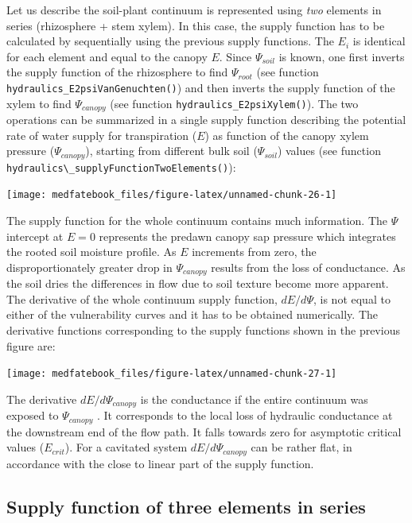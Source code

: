 \documentclass[]{book}
\begin{document}
Let us describe the soil-plant continuum is represented using \emph{two} elements in series (rhizosphere + stem xylem). In this case, the supply function has to be calculated by sequentially using the previous supply functions. The \(E_i\) is identical for each element and equal to the canopy \(E\). Since \(\Psi_{soil}\) is known, one first inverts the supply function of the rhizosphere to find \(\Psi_{root}\) (see function \texttt{hydraulics\_E2psiVanGenuchten()}) and then inverts the supply function of the xylem to find \(\Psi_{canopy}\) (see function \texttt{hydraulics\_E2psiXylem()}). The two operations can be summarized in a single supply function describing the potential rate of water supply for transpiration (\(E\)) as function of the canopy xylem pressure (\(\Psi_{canopy}\)), starting from different bulk soil (\(\Psi_{soil}\)) values (see function \texttt{hydraulics\textbackslash{}\_supplyFunctionTwoElements()}):

\begin{center}\texttt{[image: medfatebook\_files/figure-latex/unnamed-chunk-26-1]} \end{center}

The supply function for the whole continuum contains much information. The \(\Psi\) intercept at \(E=0\) represents the predawn canopy sap pressure which integrates the rooted soil moisture profile. As \(E\) increments from zero, the disproportionately greater drop in \(\Psi_{canopy}\) results from the loss of conductance. As the soil dries the differences in flow due to soil texture become more apparent. The derivative of the whole continuum supply function, \(dE/d\Psi\), is not equal to either of the vulnerability curves and it has to be obtained numerically. The derivative functions corresponding to the supply functions shown in the previous figure are:

\begin{center}\texttt{[image: medfatebook\_files/figure-latex/unnamed-chunk-27-1]} \end{center}

The derivative \(dE/d\Psi_{canopy}\) is the conductance if the entire continuum was exposed to \(\Psi_{canopy}\) \citep{Sperry2015}. It corresponds to the local loss of hydraulic conductance at the downstream end of the flow path. It falls towards zero for asymptotic critical values (\(E_{crit}\)). For a cavitated system \(dE/d\Psi_{canopy}\) can be rather flat, in accordance with the close to linear part of the supply function.

\hypertarget{supply-function-of-three-elements-in-series}{%
\subsection{Supply function of three elements in series}\label{supply-function-of-three-elements-in-series}}
\end{document}
